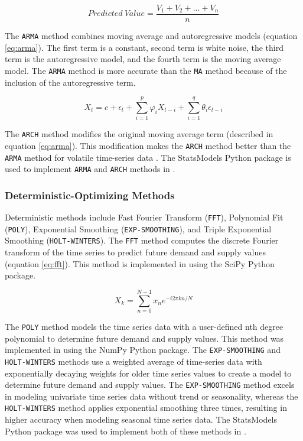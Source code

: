 \begin{equation}
	\label{eq:ma}
	Predicted\ Value = \frac{V_1+V_2+...+V_n}{n}
\end{equation}

The \texttt{ARMA} method combines moving average and
autoregressive models (equation \ref{eq:arma}).
The first term is a constant, second term is 
white noise, the third term is the autoregressive
model, and the fourth term is the moving average
model.
The \texttt{ARMA} method is more accurate than the 
\texttt{MA} method 
because of the inclusion of the autoregressive term. 

\begin{equation}
	\label{eq:arma}
	X_t = c + \epsilon_t + 
	\sum_{i=1}^p\varphi_i X_{t-i} +	
	\sum_{i=1}^q\theta_i\epsilon_{t-i}
\end{equation}

The \texttt{ARCH} method modifies the original moving 
average term (described in equation \ref{eq:arma}). 
This modification makes the \texttt{ARCH} method 
better than the \texttt{ARMA} method for volatile 
time-series data \cite{flanagan_methods_2019}. 
The StatsModels \cite{github_community_statsmodels:_2019}
Python package is used to implement \texttt{ARMA} and 
\texttt{ARCH} methods in \deploy. 

\subsubsection{Deterministic-Optimizing Methods}
Deterministic methods include
Fast Fourier Transform (\texttt{FFT}), 
Polynomial Fit (\texttt{POLY}), 
Exponential Smoothing (\texttt{EXP-SMOOTHING}), 
and Triple Exponential Smoothing (\texttt{HOLT-WINTERS}). 
The \texttt{FFT} method computes the discrete Fourier transform 
of the time series to predict future demand and supply 
values (equation \ref{eq:fft}).
This method is implemented in \deploy using the 
SciPy \cite{jones_scipy:_2016} Python package. 

\begin{equation}
	\label{eq:fft}
	X_k = \sum_{n=0}^{N-1}x_n e^{-i2\pi kn/N}
\end{equation}

The \texttt{POLY} method models the time series data 
with a user-defined nth degree polynomial to determine 
future demand and supply values. 
This method was implemented in \deploy using the 
NumPy \cite{developers_numpy_2013} Python package. 
The \texttt{EXP-SMOOTHING} and \texttt{HOLT-WINTERS} 
methods use a weighted average 
of time-series data with exponentially decaying weights 
for older time series values \cite{hyndman_forecasting:_2018}
to create a model to determine future demand and supply values. 
The \texttt{EXP-SMOOTHING} method excels in 
modeling univariate time series data without trend or seasonality, 
whereas the \texttt{HOLT-WINTERS} method applies exponential 
smoothing three times, resulting in higher accuracy when 
modeling seasonal time series data. 
The StatsModels \cite{github_community_statsmodels:_2019}
Python package was used to implement both of these methods 
in \deploy. 

